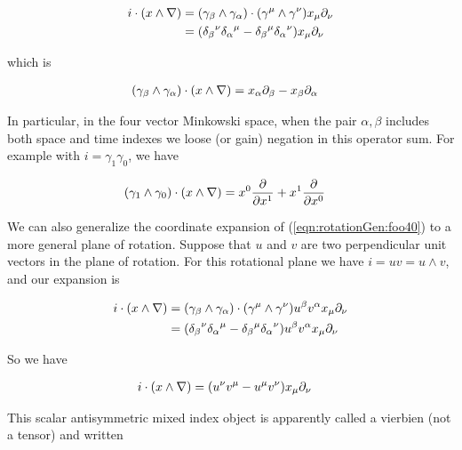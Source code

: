 \begin{align*}
i \cdot (x \wedge \nabla)
&=
(\gamma_\beta \wedge \gamma_\alpha) \cdot (\gamma^\mu  \wedge \gamma^\nu) x_\mu \partial_\nu \\
&=
({\delta_\beta}^\nu {\delta_\alpha}^\mu - {\delta_\beta}^\mu {\delta_\alpha}^\nu ) x_\mu \partial_\nu \\
\end{align*}

which is

\begin{align}\label{eqn:rotationGen:foo40}
(\gamma_\beta \wedge \gamma_\alpha) \cdot (x \wedge \nabla) &= x_\alpha \partial_\beta -x_\beta \partial_\alpha 
\end{align}

In particular, in the four vector Minkowski space, when the pair $\alpha,\beta$ includes both space and time indexes we loose (or gain) negation in this operator sum. For example with $i = \gamma_1 \gamma_0$, we have

\begin{align}\label{eqn:rotationGen:foo41}
(\gamma_1 \wedge \gamma_0) \cdot (x \wedge \nabla) 
&= x^0 \frac{\partial}{\partial x^1} + x^1 \frac{\partial}{\partial x^0}
\end{align}

We can also generalize the coordinate expansion of (\ref{eqn:rotationGen:foo40}) to a more general plane of rotation.  Suppose that $u$ and $v$ are two perpendicular unit vectors in the plane of rotation.  For this rotational plane we have $i=u v = u \wedge v$, and our expansion is

\begin{align*}
i \cdot (x \wedge \nabla) 
&=
(\gamma_\beta \wedge \gamma_\alpha) \cdot (\gamma^\mu  \wedge \gamma^\nu) u^\beta v^\alpha x_\mu \partial_\nu \\
&=
({\delta_\beta}^\nu {\delta_\alpha}^\mu - {\delta_\beta}^\mu {\delta_\alpha}^\nu ) u^\beta v^\alpha x_\mu \partial_\nu \\
\end{align*}

So we have

\begin{align}\label{eqn:rotationGen:foo42}
i \cdot (x \wedge \nabla) 
&=
(u^\nu v^\mu - u^\mu v^\nu) x_\mu \partial_\nu 
\end{align}

This scalar antisymmetric mixed index object is apparently called a vierbien (not a tensor) and written 


